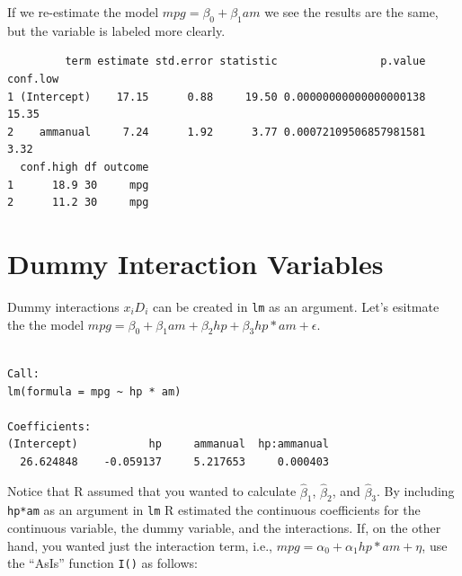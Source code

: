 \documentclass[]{book}
\newenvironment{Shaded}{\begin{snugshade}}{\end{snugshade}}
\newcommand{\KeywordTok}[1]{\textcolor[rgb]{0.13,0.29,0.53}{\textbf{#1}}}
\newcommand{\NormalTok}[1]{#1}
\newcommand{\OperatorTok}[1]{\textcolor[rgb]{0.81,0.36,0.00}{\textbf{#1}}}
\newcommand{\StringTok}[1]{\textcolor[rgb]{0.31,0.60,0.02}{#1}}
\begin{document}
If we re-estimate the model \(mpg = \beta_0+\beta_1am\) we see the results are the same, but the variable is labeled more clearly.

\begin{Shaded}
\end{Shaded}

\begin{verbatim}
         term estimate std.error statistic                p.value conf.low
1 (Intercept)    17.15      0.88     19.50 0.00000000000000000138    15.35
2    ammanual     7.24      1.92      3.77 0.00072109506857981581     3.32
  conf.high df outcome
1      18.9 30     mpg
2      11.2 30     mpg
\end{verbatim}

\hypertarget{dummy-interaction-variables}{%
\section{Dummy Interaction Variables}\label{dummy-interaction-variables}}

Dummy interactions \(x_iD_i\) can be created in \texttt{lm} as an argument. Let's esitmate the the model \(mpg= \beta_0+\beta_1am+\beta_2hp+\beta_3hp*am+\epsilon\).

\begin{Shaded}
\end{Shaded}

\begin{verbatim}

Call:
lm(formula = mpg ~ hp * am)

Coefficients:
(Intercept)           hp     ammanual  hp:ammanual  
  26.624848    -0.059137     5.217653     0.000403  
\end{verbatim}

Notice that R assumed that you wanted to calculate \(\hat\beta_1\), \(\hat\beta_2\), and \(\hat\beta_3\). By including \texttt{hp*am} as an argument in \texttt{lm} R estimated the continuous coefficients for the continuous variable, the dummy variable, and the interactions. If, on the other hand, you wanted just the interaction term, i.e., \(mpg=\alpha_0+\alpha_1hp*am+\eta\), use the ``AsIs'' function \texttt{I()} as follows:
\end{document}
